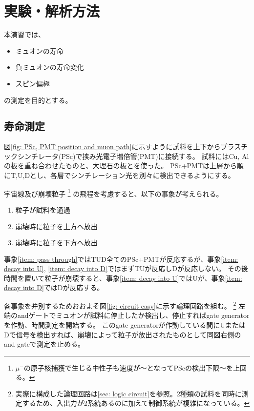 \documentclass[dvipdfmx]{jsarticle}
\begin{document}
\section{実験・解析方法}

本演習では、
\begin{itemize}
    \item ミュオンの寿命
    \item 負ミュオンの寿命変化
    \item スピン偏極
\end{itemize}
の測定を目的とする。

\subsection{寿命測定}
\label{sec: method: life}

図\ref{fig: PSc, PMT position and muon path}に示すように試料を上下からプラスチックシンチレータ(PSc)で挟み光電子増倍管(PMT)に接続する。
試料にはCu, Alの板を重ね合わせたものと、大理石の板とを使った。
PSc+PMTは上層から順にT,U,Dとし、各層でシンチレーション光を別々に検出できるようにする。

宇宙線及び崩壊粒子
\footnote{$\mu^-$の原子核捕獲で生じる中性子も速度が〜となってPScの検出下限〜を上回る。}
の飛程を考慮すると、以下の事象が考えられる。
\renewcommand{\theenumi}{(\alph{enumi})}
\begin{enumerate}
    \item \label{item: pass through}粒子が試料を通過
    \item \label{item: decay into U}崩壊時に粒子を上方へ放出
    \item \label{item: decay into D}崩壊時に粒子を下方へ放出
\end{enumerate}
事象\ref{item: pass through}ではTUD全てのPSc+PMTが反応するが、事象\ref{item: decay into U}, \ref{item: decay into D}ではまずTUが反応しDが反応しない。
その後時間を置いて粒子が崩壊すると、事象\ref{item: decay into U}ではUが、事象\ref{item: decay into D}ではDが反応する。

各事象を弁別するためおおよそ図\ref{fig: circuit easy}に示す論理回路を組む。
\footnote{実際に構成した論理回路は\ref{sec: logic circuit}を参照。2種類の試料を同時に測定するため、入出力が2系統あるのに加えて制御系統が複雑になっている。}
左端のandゲートでミュオンが試料に停止したか検出し、停止すればgate generatorを作動、時間測定を開始する。
このgate generatorが作動している間にUまたはDで信号を検出すれば、崩壊によって粒子が放出されたものとして同図右側のand gateで測定を止める。
\end{document}

